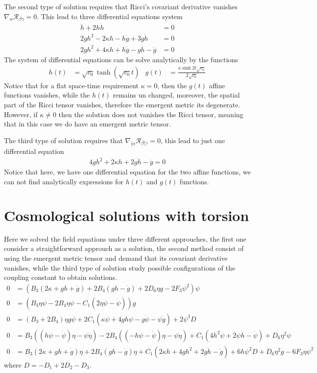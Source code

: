 \documentclass[10pt,a4paper]{article}
\begin{document}
The second type of solution requires that Ricci's covariant derivative vanishes $\nabla_{\alpha}\mathcal{R}_{\beta\gamma}  = 0$. This lead to
three differential equations system
\begin{align}
  \ddot{h} + 2h\dot{h} & = 0 \\
  2gh^2 - 2\kappa h - h\dot{g} + 3g\dot{h} & = 0 \\
  2gh^2 + 4\kappa h + h\dot{g} - g\dot{h} - \ddot{g} & = 0
\end{align}
The system of differential equations can be solve analytically by the functions
\begin{align}
  h(t) & = \sqrt{c_0}\tanh\left(\sqrt{c_0}t\right) & g(t) & = \frac{\kappa \sinh{2t\sqrt{c_0}}}{2\sqrt{c_0}} 
\end{align}
Notice that for a flat space-time requirement $\kappa = 0$, then the $g(t)$ affine functions vanishes, while the $h(t)$ remains un changed, moreover,
the spatial part of the Ricci tensor vanishes, therefore the emergent metric its degenerate. However, if $\kappa \neq 0$ then the solution does 
not vanishes the Ricci tensor, meaning that in this case we do have an emergent metric tensor.


The third type of solution requires that $\nabla_{[\alpha}\mathcal{R}_{\beta]\gamma}  = 0$, this lead to just one differential equation
\begin{align}
  4gh^2 + 2\kappa h + 2g\dot{h} - \ddot{g} = 0
\end{align}
Notice that here, we have one differential equation for the two affine functions, we can not find analytically expressions for $h(t)$ and $g(t)$ functions.



\section{Cosmological solutions with torsion}

Here we solved the field equations under three different approuches, the first one consider a straightforward approuch as a solution, the 
second method consist of using the emergent metric tensor and demand that its covariant derivative vanishes, while the third type of solution
study possible configurations of the coupling constant to obtain solutions.
\begin{align*}
  0 & = \left(B_3(2 \kappa+g h+\dot{g})+2 B_4(g h-\dot{g})+2 D_6 \eta g-2 F_3 \psi^2\right) \psi  \\
  0 & = \left(B_3 \eta \psi-2 B_4 \eta \psi-C_1(2 \eta \psi-\dot{\psi})\right) g \\
  0 & = \left(B_3+2 B_4\right) \eta g \psi+2 C_1(\kappa \psi+4 g h \psi-g \dot{\psi}-\psi \dot{g})+2 \psi^3D \\
  0 & = B_3((h \psi-\dot{\psi}) \eta-\psi \dot{\eta})-2 B_4((-h \psi-\dot{\psi}) \eta-\psi \dot{\eta})+C_1\left(4 h^2 \psi+2 \psi \dot{h}-\ddot{\psi}\right)+D_6 \eta^2 \psi  \\
  0 & = B_3(2 \kappa+g h+\dot{g}) \eta+2 B_4(g h-\dot{g}) \eta+C_1\left(2 \kappa h+4 g h^2+2 g \dot{h}-\ddot{g}\right)+6 h \psi^2D+D_6 \eta^2 g-6 F_3 \eta \psi^2 
\end{align*}
where $D = -D_1+2 D_2-D_3$.
\end{document}
